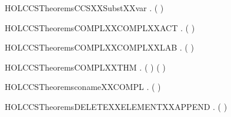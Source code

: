 \newcommand{\HOLCCSTheoremsCCSXXSubstXXrec}{\UseVerbatim{HOLCCSTheoremsCCSXXSubstXXrec}}
\begin{SaveVerbatim}{HOLCCSTheoremsCCSXXSubstXXvar}
\HOLTokenTurnstile{} \HOLSymConst{\HOLTokenForall{}} .  ( )   \HOLSymConst{=} 
\end{SaveVerbatim}
\newcommand{\HOLCCSTheoremsCCSXXSubstXXvar}{\UseVerbatim{HOLCCSTheoremsCCSXXSubstXXvar}}
\begin{SaveVerbatim}{HOLCCSTheoremsCOMPLXXCOMPLXXACT}
\HOLTokenTurnstile{} \HOLSymConst{\HOLTokenForall{}}.  ( ) \HOLSymConst{=} 
\end{SaveVerbatim}
\newcommand{\HOLCCSTheoremsCOMPLXXCOMPLXXACT}{\UseVerbatim{HOLCCSTheoremsCOMPLXXCOMPLXXACT}}
\begin{SaveVerbatim}{HOLCCSTheoremsCOMPLXXCOMPLXXLAB}
\HOLTokenTurnstile{} \HOLSymConst{\HOLTokenForall{}}.  ( ) \HOLSymConst{=} 
\end{SaveVerbatim}
\newcommand{\HOLCCSTheoremsCOMPLXXCOMPLXXLAB}{\UseVerbatim{HOLCCSTheoremsCOMPLXXCOMPLXXLAB}}
\begin{SaveVerbatim}{HOLCCSTheoremsCOMPLXXTHM}
\HOLTokenTurnstile{} \HOLSymConst{\HOLTokenForall{}} .
       ( \HOLSymConst{\HOLTokenNotEqual{}}   \HOLSymConst{\HOLTokenImp{}}   \HOLSymConst{\HOLTokenNotEqual{}}  ) \HOLSymConst{\HOLTokenConj{}}
       ( \HOLSymConst{\HOLTokenNotEqual{}}   \HOLSymConst{\HOLTokenImp{}}   \HOLSymConst{\HOLTokenNotEqual{}}  )
\end{SaveVerbatim}
\newcommand{\HOLCCSTheoremsCOMPLXXTHM}{\UseVerbatim{HOLCCSTheoremsCOMPLXXTHM}}
\begin{SaveVerbatim}{HOLCCSTheoremsconameXXCOMPL}
\HOLTokenTurnstile{} \HOLSymConst{\HOLTokenForall{}}.   \HOLSymConst{=}  ( )
\end{SaveVerbatim}
\newcommand{\HOLCCSTheoremsconameXXCOMPL}{\UseVerbatim{HOLCCSTheoremsconameXXCOMPL}}
\begin{SaveVerbatim}{HOLCCSTheoremsDELETEXXELEMENTXXAPPEND}
\HOLTokenTurnstile{} \HOLSymConst{\HOLTokenForall{}}  .
         ( \HOLSymConst{++} ) \HOLSymConst{=}
          \HOLSymConst{++}   
\end{SaveVerbatim}
